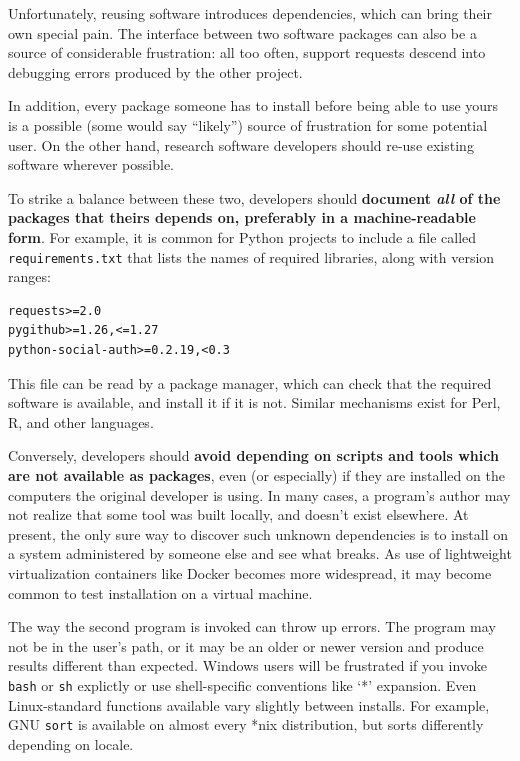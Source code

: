 \documentclass[10pt,letterpaper]{article}
\begin{document}
Unfortunately, reusing software introduces dependencies, which can
bring their own special pain.  The interface between two software
packages can also be a source of considerable frustration: all too
often, support requests descend into debugging errors produced by the
other project.

In addition, every package someone has to install
before being able to use yours is a
possible (some would say ``likely'') source of frustration for some
potential user. On the other hand, research software developers should
re-use existing software wherever possible.

To strike a balance between
these two, developers should
\textbf{document \emph{all} of the packages that theirs depends on, preferably in a machine-readable form}.
For example, it is common for Python projects to include a file called
\texttt{requirements.txt} that lists the names of required libraries,
along with version ranges:

\begin{verbatim}
requests>=2.0
pygithub>=1.26,<=1.27
python-social-auth>=0.2.19,<0.3
\end{verbatim}

This file can be read by a package manager, which can check that the
required software is available, and install it if it is not. Similar
mechanisms exist for Perl, R, and other languages.

Conversely, developers should
\textbf{avoid depending on scripts and tools which are not available as packages},
even (or especially) if they are installed on the computers the original developer is using.
In many cases, a program's author may not realize that some tool was built locally, and
doesn't exist elsewhere. At present, the only sure way to discover such
unknown dependencies is to install on a system administered by someone
else and see what breaks. As use of lightweight
virtualization containers like Docker becomes more widespread, it may
become common to test installation on a virtual machine.

The way the second program is invoked can throw up errors.
The program may not be in the user's path, or it may be an
older or newer version and produce results different than expected.
Windows users will be frustrated if you invoke \texttt{bash} or \texttt{sh} explictly or
use shell-specific conventions like `*' expansion.
Even Linux-standard functions available vary slightly between
installs. For example, GNU \texttt{sort} is available on almost every
*nix distribution, but sorts differently depending on locale.
\end{document}
